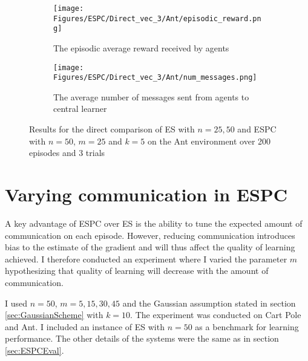 \begin{figure}[H]
    \centering
    \begin{subfigure}{0.4\textwidth}
        \centering
        \texttt{[image: Figures/ESPC/Direct\_vec\_3/Ant/episodic\_reward.png]}
        \caption{The episodic average reward received by agents}
        \label{fig:AntEpisodicReward}
    \end{subfigure}
    \begin{subfigure}{0.4\textwidth}
        \centering
        \texttt{[image: Figures/ESPC/Direct\_vec\_3/Ant/num\_messages.png]}
        \caption{The average number of messages sent from agents to central learner}
        \label{fig:AntMessages}
    \end{subfigure}
    \caption{Results for the direct comparison of ES with $n=25,50$ and ESPC with $n=50$, $m=25$ and $k=5$ on the Ant environment over 200 episodes and 3 trials}
    \label{fig:DirectAnt}
\end{figure}


\section{Varying communication in ESPC}
A key advantage of ESPC over ES is the ability to tune the expected amount of communication on each episode. However, reducing communication introduces bias to the estimate of the gradient and will thus affect the quality of learning achieved. I therefore conducted an experiment where I varied the parameter $m$ hypothesizing that quality of learning will decrease with the amount of communication.

I used $n=50$, $m=5,15,30,45$ and the Gaussian assumption stated in section \ref{sec:GaussianScheme} with $k=10$. The experiment was conducted on Cart Pole and Ant. I included an instance of ES with $n=50$ as a benchmark for learning performance. The other details of the systems were the same as in section \ref{sec:ESPCEval}.

